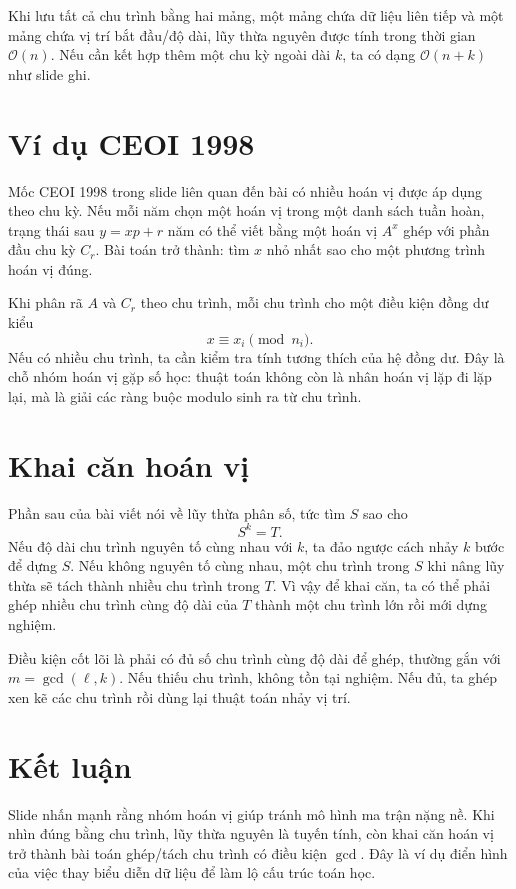\documentclass[11pt]{article}
\newcommand{\Oh}{\mathcal{O}}
\begin{document}
Khi lưu tất cả chu trình bằng hai mảng, một mảng chứa dữ liệu liên tiếp và một
mảng chứa vị trí bắt đầu/độ dài, lũy thừa nguyên được tính trong thời gian
\(\Oh(n)\). Nếu cần kết hợp thêm một chu kỳ ngoài dài \(k\), ta có dạng
\(\Oh(n+k)\) như slide ghi.

\section{Ví dụ CEOI 1998}

Mốc CEOI 1998 trong slide liên quan đến bài có nhiều hoán vị được áp dụng theo
chu kỳ. Nếu mỗi năm chọn một hoán vị trong một danh sách tuần hoàn, trạng thái
sau \(y=xp+r\) năm có thể viết bằng một hoán vị \(A^x\) ghép với phần đầu
chu kỳ \(C_r\). Bài toán trở thành: tìm \(x\) nhỏ nhất sao cho một phương
trình hoán vị đúng.

Khi phân rã \(A\) và \(C_r\) theo chu trình, mỗi chu trình cho một điều kiện
đồng dư kiểu
\[
  x\equiv x_i\pmod {n_i}.
\]
Nếu có nhiều chu trình, ta cần kiểm tra tính tương thích của hệ đồng dư. Đây
là chỗ nhóm hoán vị gặp số học: thuật toán không còn là nhân hoán vị lặp đi
lặp lại, mà là giải các ràng buộc modulo sinh ra từ chu trình.

\section{Khai căn hoán vị}

Phần sau của bài viết nói về lũy thừa phân số, tức tìm \(S\) sao cho
\[
  S^k=T.
\]
Nếu độ dài chu trình nguyên tố cùng nhau với \(k\), ta đảo ngược cách nhảy
\(k\) bước để dựng \(S\). Nếu không nguyên tố cùng nhau, một chu trình trong
\(S\) khi nâng lũy thừa sẽ tách thành nhiều chu trình trong \(T\). Vì vậy để
khai căn, ta có thể phải ghép nhiều chu trình cùng độ dài của \(T\) thành một
chu trình lớn rồi mới dựng nghiệm.

Điều kiện cốt lõi là phải có đủ số chu trình cùng độ dài để ghép, thường gắn
với \(m=\gcd(\ell,k)\). Nếu thiếu chu trình, không tồn tại nghiệm. Nếu đủ, ta
ghép xen kẽ các chu trình rồi dùng lại thuật toán nhảy vị trí.

\section{Kết luận}

Slide nhấn mạnh rằng nhóm hoán vị giúp tránh mô hình ma trận nặng nề. Khi nhìn
đúng bằng chu trình, lũy thừa nguyên là tuyến tính, còn khai căn hoán vị trở
thành bài toán ghép/tách chu trình có điều kiện \(\gcd\). Đây là ví dụ điển
hình của việc thay biểu diễn dữ liệu để làm lộ cấu trúc toán học.
\end{document}
